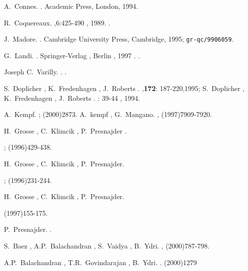 \documentclass[a4paper,12pt]{article}
\begin{document}
\begin{thebibliography}{10}
A.~Connes.
.
\newblock Academic Press, London, 1994.

R.~Coquereaux.
,6:425-490 , 1989.
.

J.~Madore.
.
\newblock Cambridge University Press, Cambridge, 1995;
{\tt gr-qc/9906059}.

G.~Landi.
.
\newblock Springer-Verlag , Berlin , 1997 .
.

Joseph C.~Varilly.
.
.


S.~Doplicher , K.~Fredenhagen , J.~Roberts .
,{\bf 172}: 187-220,1995;
S.~Doplicher , K.~Fredenhagen , J.~Roberts .
 : 39-44 , 1994.

A.~Kempf.
;
(2000)2873.
A.~kempf , G.~Mangano.
,
(1997)7909-7920.

H.~Grosse , C.~Klimcik , P.~Presnajder .

;
(1996)429-438.

H.~Grosse , C.~Klimcik , P.~Presnajder.

;
(1996)231-244.

H.~Grosse , C.~Klimcik , P.~Presnajder.

(1997)155-175.


P.~Presnajder.
.


S.~Baez , A.P.~Balachandran , S.~Vaidya , B.~Ydri.
 ,
(2000)787-798.

A.P.~Balachandran , T.R.~Govindarajan , B.~Ydri.
 .
(2000)1279


\end{thebibliography}
\end{document}
